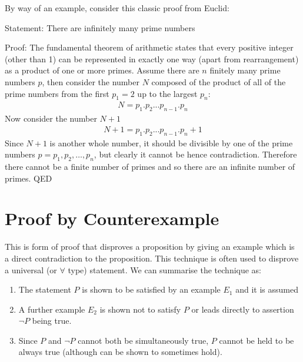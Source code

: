 \documentclass[letterpaper,10pt,english]{jupyterBook}
\begin{document}
\sphinxAtStartPar
By way of an example, consider this classic proof from Euclid:

\sphinxAtStartPar
Statement: There are infinitely many prime numbers

\sphinxAtStartPar
Proof:
The fundamental theorem of arithmetic states that every positive integer (other than 1) can be represented in exactly one way (apart from rearrangement)
as a product of one or more primes.  Assume there are \(n\) finitely many prime numbers \(p\), then consider the number \(N\) composed of the product of all of the
prime numbers from the first \(p_1 = 2\) up to the largest \(p_n\):
\begin{equation*}
\begin{split}N = p_1.p_2...p_{n-1}.p_n\end{split}
\end{equation*}
\sphinxAtStartPar
Now consider the number \(N+1\)
\begin{equation*}
\begin{split}N+1 = p_1.p_2...p_{n-1}.p_n+1\end{split}
\end{equation*}
\sphinxAtStartPar
Since \(N+1\) is another whole number, it should be divisible by one of the prime numbers \(p={p_1,p_2,\dots,p_n}\), but clearly it cannot be \sphinxhyphen{} hence contradiction.  Therefore
there cannot be a finite number of primes and so there are an infinite number of primes. QED


\section{Proof by Counterexample}
\label{\detokenize{ProofLogic/methodsofproof:proof-by-counterexample}}
\sphinxAtStartPar
This is form of proof that disproves a proposition by giving an example which is a direct contradiction to the proposition.  This technique is often used to disprove a
universal (or \(\forall\) type) statement.  We can summarise the technique as:
\begin{enumerate}
%
\item {} 
\sphinxAtStartPar
The statement \(P\) is shown to be satisfied by an example \(E_1\) and it is assumed

\item {} 
\sphinxAtStartPar
A further example \(E_2\) is shown not to satisfy \(P\) or leads directly to assertion \(\lnot P\) being true.

\item {} 
\sphinxAtStartPar
Since \(P\) and \(\lnot P\) cannot both be simultaneously true, \(P\) cannot be held to be always true (although can be shown to sometimes hold).

\end{enumerate}
\end{document}
